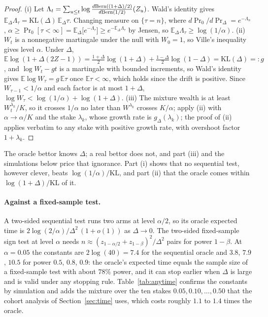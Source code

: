 \begin{proof}
(i) Let $\Lambda_t=\sum_{u\le t}\log\frac{d\mathrm{Bern}((1+\Delta)/2)}{d\mathrm{Bern}(1/2)}(Z_u)$. Wald's
identity \citep{wald1945sequential} gives $\mathbb{E}_\Delta\Lambda_\tau=\mathrm{KL}(\Delta)\,\mathbb{E}_\Delta\tau$.
Changing measure on $\{\tau=n\}$, where $d\Pr_0/d\Pr_\Delta=e^{-\Lambda_n}$,
$\alpha\ge\Pr_0[\tau<\infty]=\mathbb{E}_\Delta\bigl[e^{-\Lambda_\tau}\bigr]\ge
e^{-\mathbb{E}_\Delta\Lambda_\tau}$ by Jensen, so $\mathbb{E}_\Delta\Lambda_\tau\ge
\log(1/\alpha)$.
(ii) $W_t$ is a nonnegative martingale under the null with $W_0=1$, so Ville's inequality
gives level $\alpha$. Under $\Delta$, $\mathbb{E}\log(1+\Delta(2Z-1))=\frac{1+\Delta}2
\log(1+\Delta)+\frac{1-\Delta}2\log(1-\Delta)=\mathrm{KL}(\Delta)=:g$, and
$\log W_t-gt$ is a martingale with bounded increments, so Wald's identity gives
$\mathbb{E}\log W_\tau=g\,\mathbb{E}\tau$ once $\mathbb{E}\tau<\infty$, which holds since the
drift is positive. Since $W_{\tau-1}<1/\alpha$ and each factor is at most $1+\Delta$,
$\log W_\tau<\log(1/\alpha)+\log(1+\Delta)$.
(iii) The mixture wealth is at least $W^{\lambda_k}_t/K$, so it crosses $1/\alpha$ no later
than $W^{\lambda_k}$ crosses $K/\alpha$; apply (ii) with $\alpha\to\alpha/K$ and the stake
$\lambda_k$, whose growth rate is $g_\Delta(\lambda_k)$; the proof of (ii) applies verbatim
to any stake with positive growth rate, with overshoot factor $1+\lambda_k$.
\end{proof}

The oracle bettor knows $\Delta$; a real bettor does not, and part (iii) and the
simulations below price that ignorance. Part (i) shows that no sequential test, however
clever, beats $\log(1/\alpha)/\mathrm{KL}$, and part (ii) that the oracle comes within
$\log(1+\Delta)/\mathrm{KL}$ of it.

\paragraph{Against a fixed-sample test.} A two-sided sequential test runs two arms at level
$\alpha/2$, so its oracle expected time is $2\log(2/\alpha)/\Delta^2\,(1+o(1))$ as
$\Delta\to0$. The two-sided fixed-sample sign test at level $\alpha$ needs
$n\approx(z_{1-\alpha/2}+z_{1-\beta})^2/\Delta^2$ pairs for power $1-\beta$. At
$\alpha=0.05$ the constants are $2\log(40)=7.4$ for the sequential oracle and $3.8$, $7.9$,
$10.5$ for power $0.5$, $0.8$, $0.9$: the oracle's expected time equals the sample size of
a fixed-sample test with about $78\%$ power, and it can stop earlier when $\Delta$ is large
and is valid under any stopping rule. Table~\ref{tab:anytime} confirms the
constants by simulation and adds the mixture over the ten stakes
$0.05,0.10,\dots,0.50$ that the cohort analysis of Section~\ref{sec:time} uses, which costs
roughly $1.1$ to $1.4$ times the oracle.

